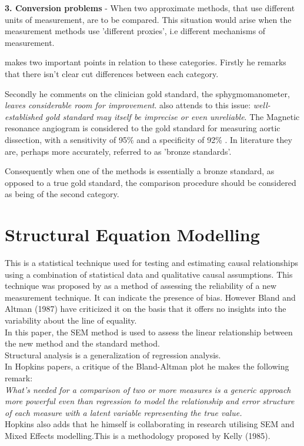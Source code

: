 \documentclass[12pt, a4paper]{article}
\begin{document}
\smallskip
\textbf{3. Conversion problems} -  When two approximate methods,
that use different units of measurement, are to be compared. This
situation would arise when the measurement methods use 'different
proxies', i.e different mechanisms of measurement.

\bigskip
\citet{DunnSEME} makes two important points in relation to these
categories. Firstly he remarks that there isn't clear cut
differences between each category.

Secondly he comments on the clinician gold standard, the
sphygmomanometer, \emph{leaves considerable room for improvement}.
\citet{pizzi} also attends to this issue: \emph{well-established
gold standard may itself be imprecise or even unreliable}.
\bigskip
The Magnetic resonance angiogram is considered to the gold
standard for measuring aortic dissection, with a sensitivity of
95\% and a specificity of 92\% . \citep{ACR}
\bigskip
In literature they are, perhaps more accurately, referred to as
'bronze standards'.
\bigskip

Consequently when one of the methods is essentially a bronze
standard, as opposed to a true gold standard, the comparison
procedure should be considered as being of the second category.

\section{Structural Equation Modelling}
This is a statistical technique used for testing and estimating causal relationships using a combination of statistical data and qualitative causal assumptions. This technique was proposed by \citet{Lewis} as a method of assessing the reliability of a new measurement technique. It can indicate the presence of bias. However Bland and Altman (1987) have criticized it on the basis that it offers no insights into the variability about the line of equality.
\\
In this paper, the SEM method is used to assess the linear relationship between the new method and the standard method.
\\
Structural analysis is a generalization of regression analysis.
\\
In Hopkins papers, a critique of the Bland-Altman plot he makes the following remark:
\\
\emph{What's needed for a comparison of two or more measures is a
generic approach more powerful even than regression to model the
relationship and error structure of each measure with a latent
variable representing the true value.}
\\
Hopkins also adds that he himself is collaborating in research utilising SEM and Mixed Effects modelling.This is a methodology proposed by Kelly (1985).
\end{document}
